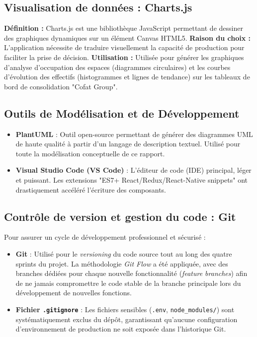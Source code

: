 \subsection{Visualisation de données : Charts.js}
\textbf{Définition :} Charts.js est une bibliothèque JavaScript permettant de dessiner des graphiques dynamiques sur un élément Canvas HTML5.
\newline
\textbf{Raison du choix :} L'application nécessite de traduire visuellement la capacité de production pour faciliter la prise de décision.
\newline
\textbf{Utilisation :} Utilisée pour générer les graphiques d'analyse d'occupation des espaces (diagrammes circulaires) et les courbes d'évolution des effectifs (histogrammes et lignes de tendance) sur les tableaux de bord de consolidation "Cofat Group".

\subsection{Outils de Modélisation et de Développement}
\begin{itemize}
    \item \textbf{PlantUML} : Outil open-source permettant de générer des diagrammes UML de haute qualité à partir d'un langage de description textuel. Utilisé pour toute la modélisation conceptuelle de ce rapport.
    \item \textbf{Visual Studio Code (VS Code)} : L'éditeur de code (IDE) principal, léger et puissant. Les extensions "ES7+ React/Redux/React-Native snippets" ont drastiquement accéléré l'écriture des composants.
\end{itemize}

\subsection{Contrôle de version et gestion du code : Git}
Pour assurer un cycle de développement professionnel et sécurisé :
\begin{itemize}
    \item \textbf{Git} : Utilisé pour le \textit{versioning} du code source tout au long des quatre sprints du projet. La méthodologie \textit{Git Flow} a été appliquée, avec des branches dédiées pour chaque nouvelle fonctionnalité (\textit{feature branches}) afin de ne jamais compromettre le code stable de la branche principale lors du développement de nouvelles fonctions.
    \item \textbf{Fichier \texttt{.gitignore}} : Les fichiers sensibles (\texttt{.env}, \texttt{node\_modules/}) sont systématiquement exclus du dépôt, garantissant qu'aucune configuration d'environnement de production ne soit exposée dans l'historique Git.
\end{itemize}

